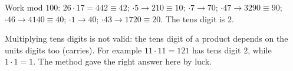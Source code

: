 Work mod $100$: $26\cdot17=442\equiv42$; $\cdot5\to210\equiv10$; $\cdot7\to70$; $\cdot47\to3290\equiv90$; $\cdot46\to4140\equiv40$; $\cdot1\to40$; $\cdot43\to1720\equiv20$. The tens digit is $\boxed{2}$.

Multiplying tens digits is not valid: the tens digit of a product depends on the units digits too (carries). For example $11\cdot11=121$ has tens digit $2$, while $1\cdot1=1$. The method gave the right answer here by luck.
